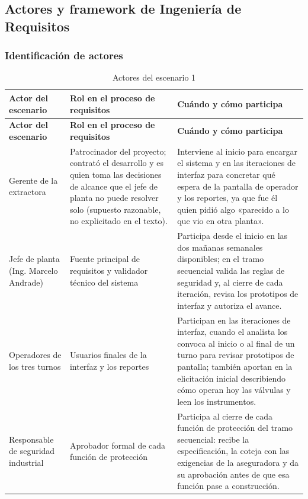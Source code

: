 \documentclass[12pt,a4paper]{article}
\begin{document}
\subsection{Actores y framework de Ingeniería de Requisitos}

\subsubsection{Identificación de actores}

\begingroup\small\setlength{\tabcolsep}{4pt}
\begin{longtable}{>{\raggedright\arraybackslash}p{2.8cm} >{\raggedright\arraybackslash}p{5.0cm} >{\raggedright\arraybackslash}p{6.7cm}}
\caption{Actores del escenario 1}\\
\toprule
\textbf{Actor del escenario} &
\textbf{Rol en el proceso de requisitos} &
\textbf{Cuándo y cómo participa} \\
\midrule
\endfirsthead
\toprule
\textbf{Actor del escenario} &
\textbf{Rol en el proceso de requisitos} &
\textbf{Cuándo y cómo participa} \\
\midrule
\endhead
Gerente de la extractora &
Patrocinador del proyecto; contrató el desarrollo y es quien toma las decisiones de alcance que el jefe de planta no puede resolver solo (supuesto razonable, no explicitado en el texto). &
Interviene al inicio para encargar el sistema y en las iteraciones de interfaz para concretar qué espera de la pantalla de operador y los reportes, ya que fue él quien pidió algo «parecido a lo que vio en otra planta». \\
\midrule
Jefe de planta (Ing. Marcelo Andrade) &
Fuente principal de requisitos y validador técnico del sistema &
Participa desde el inicio en las dos mañanas semanales disponibles; en el tramo secuencial valida las reglas de seguridad y, al cierre de cada iteración, revisa los prototipos de interfaz y autoriza el avance. \\
\midrule
Operadores de los tres turnos &
Usuarios finales de la interfaz y los reportes &
Participan en las iteraciones de interfaz, cuando el analista los convoca al inicio o al final de un turno para revisar prototipos de pantalla; también aportan en la elicitación inicial describiendo cómo operan hoy las válvulas y leen los instrumentos. \\
\midrule
Responsable de seguridad industrial &
Aprobador formal de cada función de protección &
Participa al cierre de cada función de protección del tramo secuencial: recibe la especificación, la coteja con las exigencias de la aseguradora y da su aprobación antes de que esa función pase a construcción. \\

\end{longtable}
\end{document}
